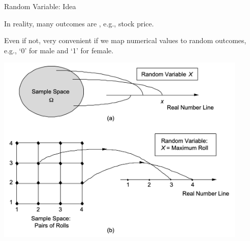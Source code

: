 \documentclass[fleqn,aspectratio=169]{beamer}
\begin{document}
\begin{frame}{Random Variable: Idea}


{
\plitemsep 0.1in

\bci 
\item In reality, many outcomes are , e.g., stock price.

\item Even if not, very convenient if we map numerical values to random outcomes, e.g., `0' for male and `1' for female.

\eci 
}
{
\centering
\includegraphics[width=0.9\textwidth]{L3_RV_ex.png}
}

\end{frame}
\end{document}
